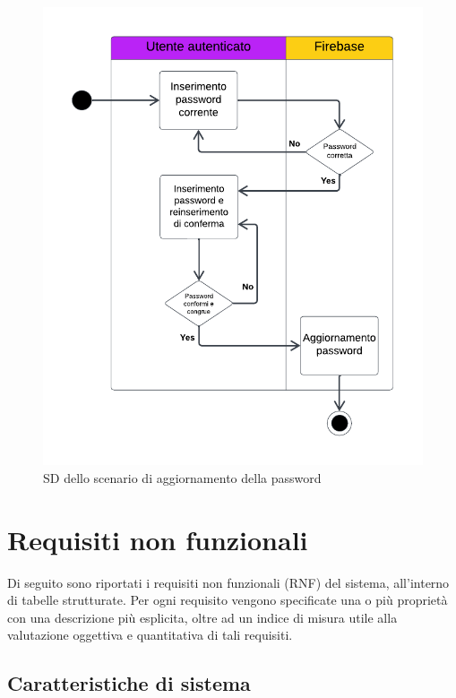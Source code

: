 \documentclass[11pt, a4paper]{article}
\theoremstyle{definition} %
\begin{document}
\begin{figure}[H]
\centering
\hspace*{-0.7cm}
\includegraphics[scale = 1]{materiale/ucdiagrams/swimlanepassword.pdf}
\caption{SD dello scenario di aggiornamento della password}
\label{slpassword}
\end{figure}


\newpage
\section{Requisiti non funzionali}
Di seguito sono riportati i requisiti non funzionali (RNF)
del sistema, all'interno di tabelle strutturate. Per ogni requisito vengono
specificate una o più proprietà con una descrizione più esplicita,
oltre ad un indice di misura utile alla valutazione oggettiva
e quantitativa di tali requisiti.

\subsection{Caratteristiche di sistema}
\end{document}
